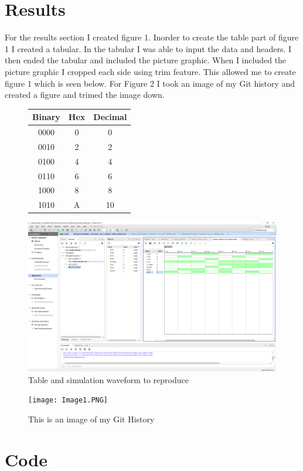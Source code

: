 \documentclass[11pt]{article}
\newcommand{\Verilog}[2][]{%
	
}
\begin{document}
\section*{Results}

For the results section I created figure 1. Inorder to create the table part of figure 1 I created a tabular. In the tabular I was able to input the data and headers. I then ended the tabular and included the picture graphic. When I included the picture graphic I cropped each side using trim feature. This allowed me to create figure 1 which is seen below. For Figure 2 I took an image of my Git history and created a figure and trimed the image down.

\begin{figure}[ht]\centering
	\begin{tabular}{c|c|c}
		\toprule
		Binary & Hex & Decimal \\
		\midrule
		0000 & 0 & 0 \\
		0010 & 2 & 2 \\
		0100 & 4 & 4 \\
		0110 & 6 & 6 \\
		1000 & 8 & 8 \\
		1010 & A & 10 \\
		\bottomrule
	\end{tabular} 
	\includegraphics[width=1\textwidth,trim=18.5cm 15.75cm .5cm 4.5cm,clip]{lab1_example_screenshot.PNG}
	\caption{Table and simulation waveform to reproduce}
	\label{fig:another_image}          %
\end{figure}

\begin{figure}[ht]\centering
	\texttt{[image: Image1.PNG]}
	\caption{This is an image of my Git History}
	\label{fig:image}		%
\end{figure}

\section*{Code}

\Verilog[caption=File-included from canvas]{lab1_example_code.sv}
\end{document}
